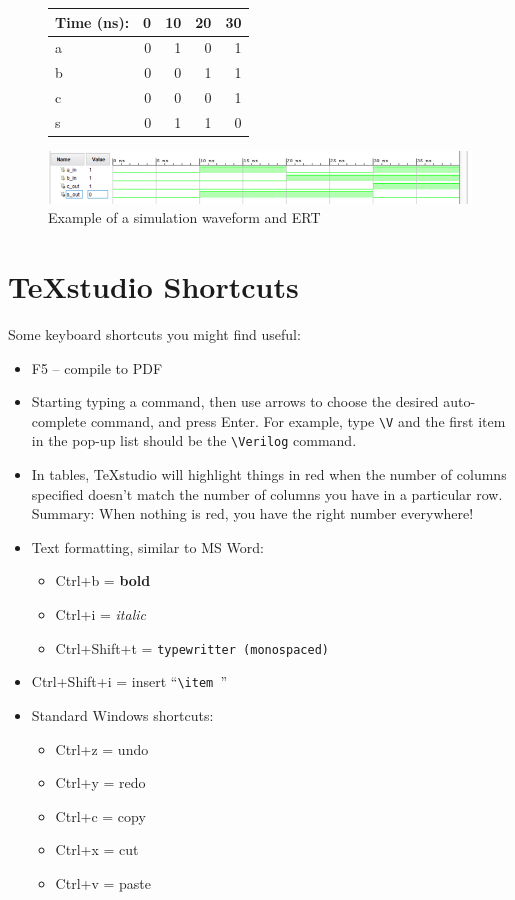 \documentclass[11pt]{article}
\newcommand{\Verilog}[2][]{%
	
}
\begin{document}
\begin{figure}[ht]\centering
	\begin{tabular}{l|rrrr}
		Time (ns): & 0 & 10 & 20 & 30 \\
		\midrule
		a & 0 & 1 & 0 & 1 \\
		b & 0 & 0 & 1 & 1 \\
		\midrule
		c & 0 & 0 & 0 & 1 \\
		s & 0 & 1 & 1 & 0 \\
		\bottomrule
	\end{tabular}\medskip
	
	\includegraphics{sim_waveform}
	\caption{Example of a simulation waveform and ERT}
	\label{fig:sim_with_table}
\end{figure}


\section*{TeXstudio Shortcuts}
Some keyboard shortcuts you might find useful:

\begin{itemize}
	\item F5 -- compile to PDF
	\item Starting typing a command, then use arrows to choose the desired auto-complete command, and press Enter.  For example, type \verb|\V| and the first item in the pop-up list should be the \verb|\Verilog| command.
	\item In tables, TeXstudio will highlight things in red when the number of columns specified doesn't match the number of columns you have in a particular row.  Summary: When nothing is red, you have the right number everywhere!
	\item Text formatting, similar to MS Word:
	\begin{itemize}
		\item Ctrl+b = \textbf{bold}
		\item Ctrl+i = \textit{italic}
		\item Ctrl+Shift+t = \texttt{typewritter (monospaced)}
	\end{itemize}
	\item Ctrl+Shift+i = insert ``\verb|\item |''
	\item Standard Windows shortcuts:
	\begin{itemize}
		\item Ctrl+z = undo
		\item Ctrl+y = redo
		\item Ctrl+c = copy
		\item Ctrl+x = cut
		\item Ctrl+v = paste
	\end{itemize}
\end{itemize}
\end{document}
